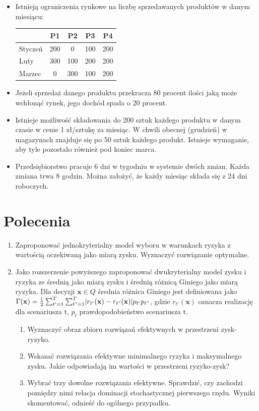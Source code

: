 \documentclass[11pt,a4paper]{article}
\begin{document}
\begin{itemize}
  \item Istnieją ograniczenia rynkowe na liczbę sprzedawanych produktów w danym miesiącu:
  \begin{center}
  \begin{tabular}{l*{4}{c}}
  	\hline
              			& P1 & P2 & P3 & P4 \\
	\hline
	Styczeń 			& 200 & 0 & 100 & 200 \\
	Luty   				& 300 & 100 & 200 & 200 \\
	Marzec 				& 0 & 300 & 100 & 200  \\
	\hline
	\end{tabular}
	\end{center}
	
	\item Jeżeli sprzedaż danego produktu przekracza 80 procent ilości jaką może wchłonąć rynek, 
    jego dochód spada o 20 procent.
	
	\item Istnieje możliwość składowania do 200 sztuk każdego produktu w danym czasie w cenie 1 zł/sztukę 
    za miesiąc. W chwili obecnej (grudzień) w magazynach znajduje się po 50 sztuk każdego produkt. 
    Istnieje wymaganie, aby tyle pozostało również pod koniec marca.
	
	\item Przedsiębiorstwo pracuje 6 dni w tygodniu w systemie dwóch zmian. Każda zmiana trwa 8 godzin. 
    Można założyć, że każdy miesiąc składa się z 24 dni roboczych.
\end{itemize}

\section*{Polecenia}
\begin{enumerate}
  \item Zaproponować jednokryterialny model wyboru w warunkach ryzyka z wartością oczekiwaną jako 
  miarą zysku. Wyznaczyć rozwiązanie optymalne.
  \item Jako rozszerzenie powyższego zaproponować dwukryterialny model zysku i ryzyka ze średnią 
  jako miarą zysku i średnią różnicą Giniego jako miarą ryzyka. Dla decyzji 
  $\mathbf{x}\in Q$ średnia różnica Giniego jest definiowana jako 
  $\Gamma(\mathbf{x})=\frac{1}{2}\sum_{t'=1}^{T}\sum_{t"=1}^{T}\lvert r_{t'}(\mathbf{x})-r_{t"}(\mathbf{x})\rvert p_{t'}p_{t"}$, gdzie $r_{t'}(\mathbf{x})$ 
  oznacza realizację dla scenariusza t, $p_{t}$ prawdopodobieństwo scenariusza t.
  \begin{enumerate}
    \item Wyznaczyć obraz zbioru rozwiązań efektywnych w przestrzeni zysk-ryzyko.
    \item Wskazać rozwiązania efektywne minimalnego ryzyka i maksymalnego zysku. Jakie odpowiadają im 
    wartości w przestrzeni ryzyko-zysk?
    \item Wybrać trzy dowolne rozwiązania efektywne. Sprawdzić, czy zachodzi pomiędzy nimi relacja 
    dominacji stochastycznej pierwszego rzędu. Wyniki skomentować, odnieść do ogólnego przypadku.
  \end{enumerate}
\end{enumerate}
\end{document}
